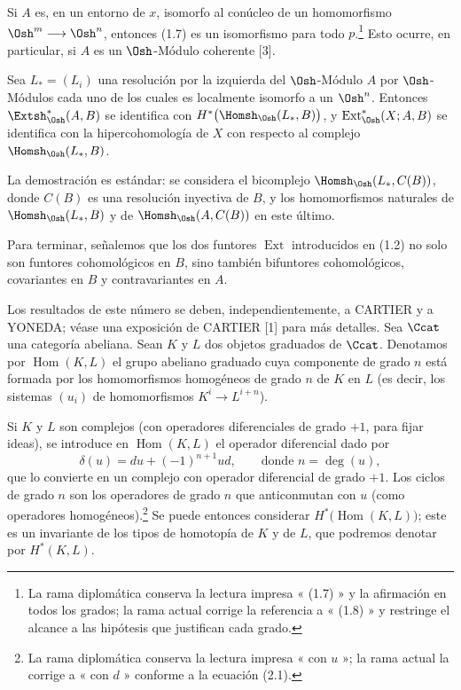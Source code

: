  Si $A$ es, en un entorno de $x$, isomorfo al
conúcleo de un homomorfismo $\Osh^{m}\longrightarrow\Osh^{n}$, entonces (1.7) es un
isomorfismo para todo $p$.\footnote{La rama diplomática conserva la lectura
impresa « (1.7) » y la afirmación en todos los grados; la rama actual corrige
la referencia a « (1.8) » y restringe el alcance a las hipótesis que justifican
cada grado.} Esto ocurre, en
particular, si $A$ es un $\Osh$-Módulo coherente [3].

 Sea $L_{*}=(L_i)$ una resolución por la izquierda del
$\Osh$-Módulo $A$ por $\Osh$-Módulos cada uno de los cuales es localmente isomorfo a
un $\Osh^{n}$. Entonces $\Extsh_{\Osh}^{*}(A,B)$ se identifica con
$H^{*}\bigl(\Homsh_{\Osh}(L_{*},B)\bigr)$, y
$\operatorname{Ext}_{\Osh}^{*}(X;A,B)$ se identifica con la hipercohomología de $X$
con respecto al complejo $\Homsh_{\Osh}(L_{*},B)$.

La demostración es estándar: se considera el bicomplejo
$\Homsh_{\Osh}(L_{*},C(B))$, donde $C(B)$ es una resolución inyectiva de $B$, y los
homomorfismos naturales de $\Homsh_{\Osh}(L_{*},B)$ y de
$\Homsh_{\Osh}(A,C(B))$ en este último.

Para terminar, señalemos que los dos funtores $\operatorname{Ext}$ introducidos
en (1.2) no solo son funtores cohomológicos en $B$, sino también
bifuntores cohomológicos, covariantes en $B$ y contravariantes en $A$.


Los resultados de este número se deben, independientemente, a CARTIER y a YONEDA; véase
una exposición de CARTIER [1] para más detalles. Sea $\Ccat$ una categoría abeliana.
Sean $K$ y $L$ dos objetos graduados de $\Ccat$. Denotamos por
$\operatorname{Hom}(K,L)$ el grupo abeliano graduado cuya componente de grado
$n$ está formada por los homomorfismos homogéneos de grado $n$ de $K$ en $L$ (es decir,
los sistemas $(u_i)$ de homomorfismos $K^{i}\longrightarrow L^{i+n}$).

Si $K$ y $L$ son complejos (con operadores diferenciales de grado $+1$, para
fijar ideas), se introduce en $\operatorname{Hom}(K,L)$ el operador
diferencial dado por
\begin{equation}\tag{2.1}
  \delta(u)=du+(-1)^{n+1}ud,\qquad\text{donde }n=\deg(u),
\end{equation}
que lo convierte en un complejo con operador diferencial de grado $+1$. Los ciclos de
grado $n$ son los operadores de grado $n$ que anticonmutan con $u$ (como
operadores homogéneos).\footnote{La rama diplomática conserva la lectura
impresa « con $u$ »; la rama actual la corrige a « con $d$ » conforme a
la ecuación (2.1).} Se puede entonces considerar
$H^{*}\bigl(\operatorname{Hom}(K,L)\bigr)$; este es un invariante de los tipos
de homotopía de $K$ y de $L$, que podremos denotar por $H^{*}(K,L)$.

